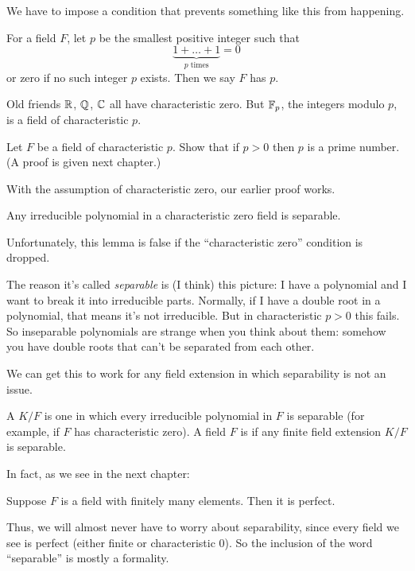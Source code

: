 We have to impose a condition that prevents something like this from happening.
\begin{definition}
	For a field $F$, let $p$ be the smallest positive integer such that
	\[ \underbrace{1+\dots+1}_{\text{$p$ times}} = 0 \]
	or zero if no such integer $p$ exists.
	Then we say $F$ has  $p$.
\end{definition}
\begin{example}
	Old friends $\mathbb R$, $\mathbb Q$, $\mathbb C$ all have characteristic zero.
	But $\mathbb F_p$, the integers modulo $p$, is a field of characteristic $p$.
\end{example}
\begin{exercise}
	Let $F$ be a field of characteristic $p$.
	Show that if $p > 0$ then $p$ is a prime number.
	(A proof is given next chapter.)
\end{exercise}
With the assumption of characteristic zero, our earlier proof works.
\begin{lemma}
	Any irreducible polynomial in a characteristic zero field is separable.
\end{lemma}
Unfortunately, this lemma is false if the ``characteristic zero'' condition is dropped.

\begin{remark}
	The reason it's called \emph{separable} is (I think) this picture:
	I have a polynomial and I want to break it into irreducible parts.
	Normally, if I have a double root in a polynomial, that means it's not irreducible.
	But in characteristic $p > 0$ this fails.
	So inseparable polynomials are strange when you think about them: somehow
	you have double roots that can't be separated from each other.
\end{remark}

We can get this to work for any field extension in which separability is not an issue.
\begin{definition}
	A  $K/F$ is one in which every irreducible
	polynomial in $F$ is separable (for example, if $F$ has characteristic zero).
	A field $F$ is  if any finite field extension $K/F$ is separable.
\end{definition}
In fact, as we see in the next chapter:
\begin{theorem}
	Suppose $F$ is a field with finitely many elements. Then it is perfect.
\end{theorem}
Thus, we will almost never have to worry about separability,
since every field we see is perfect (either finite or characteristic $0$).
So the inclusion of the word ``separable'' is mostly a formality.

